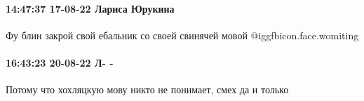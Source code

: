  
 
 
 
 

\paragraph{14:47:37 17-08-22 Лариса Юрукина}

Фу блин закрой свой ебальник со своей свинячей мовой  @igg{fbicon.face.womiting} 

\paragraph{16:43:23 20-08-22 Л- -}

Потому что хохляцкую мову никто не понимает, смех да и только


